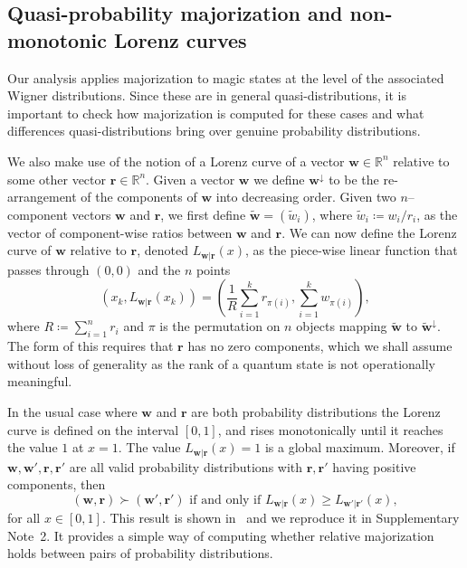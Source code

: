 \documentclass[
onecolumn,
superscriptaddress
]{revtex4-1}
\def\r{\boldsymbol{r}}
\def\w{\boldsymbol{w}}
\begin{document}
\subsection*{Quasi-probability majorization and non-monotonic Lorenz curves}

Our analysis applies majorization to magic states at the level of the associated Wigner distributions. Since these are in general quasi-distributions, it is important to check how majorization is computed for these cases and what differences quasi-distributions bring over genuine probability distributions.

We also make use of the notion of a Lorenz curve of a vector $\w \in \mathbb{R}^n$ relative to some other vector $\r \in \mathbb{R}^n$. Given a vector $\w$ we define $\w^\downarrow$ to be the re-arrangement of the components of $\w$ into decreasing order. Given two $n$--component vectors $\w$ and $\r$, we first define $\widetilde{\w}=(\widetilde{w}_i)$, where $\widetilde{w}_i \coloneqq w_i/r_i$, as the vector of component-wise ratios between $\w$ and $\r$.
We can now define the Lorenz curve of $\w$ relative to $\r$, denoted $L_{\w|\r}(x)$, as the piece-wise linear function that passes through $(0,0)$ and the $n$ points
\begin{equation}\label{eq:lc}
	(x_k,L_{\w|\r}(x_k)) =\left( \frac{1}{R}\sum_{i=1}^k r_{\pi(i)}, \sum_{i=1}^k w_{\pi(i)} \right),
\end{equation}
where $R\coloneqq \sum_{i=1}^n r_i$ and $\pi$ is the permutation on $n$ objects mapping $\widetilde{\w}$ to $\widetilde{\w}^{\downarrow}$. The form of this requires that $\r$ has no zero components, which we shall assume without loss of generality as the rank of a quantum state is not operationally meaningful.

In the usual case where $\w$ and $\r$ are both probability distributions the Lorenz curve is defined on the interval $[0,1]$, and rises monotonically until it reaches the value $1$ at $x=1$. The value $L_{\w|\r}(x) = 1$ is a global maximum. Moreover, if $\w, \w', \r, \r'$ are all valid probability distributions with $\r,\r'$ having positive components, then
\begin{equation*}
	(\w, \r) \succ (\w', \r') \mbox{ if and only if } L_{\w |\r}(x) \ge L_{\w' |\r'}(x),
\end{equation*}
for all $x \in [0,1]$. 
This result is shown in~\cite{ruch_mixing_1978} and we reproduce it in Supplementary Note~2.
It provides a simple way of computing whether relative majorization holds between pairs of probability distributions.
\end{document}
